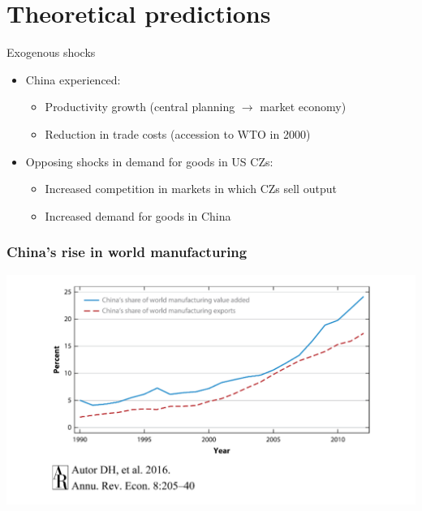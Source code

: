 \documentclass[notes=show]{beamer}
\begin{document}
\section{Theoretical predictions}

\begin{frame}{Exogenous shocks}
\begin{itemize}
\item<1-> China experienced: \bigskip
\begin{itemize}
    \item<1-> Productivity growth (central planning $\rightarrow$ market economy) \bigskip
    \item<1-> Reduction in trade costs (accession to WTO in 2000) \bigskip
\end{itemize} \medskip
\item<1-> Opposing shocks in demand for goods in US CZs: \bigskip
\begin{itemize}
    \item<1-> Increased competition in markets in which CZs sell output \bigskip
    \item<1-> Increased demand for goods in China
\end{itemize}
\end{itemize}
\end{frame}

\begin{frame}
\frametitle{China's rise in world manufacturing}
\begin{center}
\includegraphics[width=\textwidth]{AR-fig-2.pdf}%
\end{center}
\end{frame}
\end{document}
